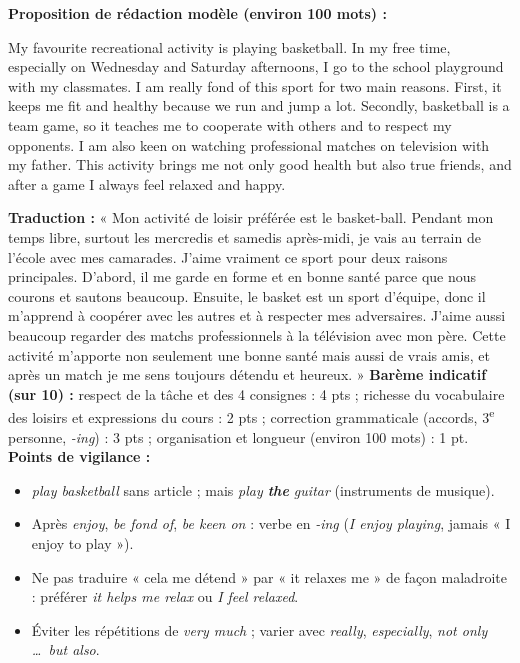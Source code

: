 \documentclass[11pt]{article}
\begin{document}
\begin{corrige}
\textbf{Proposition de rédaction modèle (environ 100 mots) :}
\begin{textebox}
My favourite recreational activity is playing basketball. In my free time, especially on Wednesday and Saturday afternoons, I go to the school playground with my classmates. I am really fond of this sport for two main reasons. First, it keeps me fit and healthy because we run and jump a lot. Secondly, basketball is a team game, so it teaches me to cooperate with others and to respect my opponents. I am also keen on watching professional matches on television with my father. This activity brings me not only good health but also true friends, and after a game I always feel relaxed and happy.
\end{textebox}
\textbf{Traduction :} « Mon activité de loisir préférée est le basket-ball. Pendant mon temps libre, surtout les mercredis et samedis après-midi, je vais au terrain de l'école avec mes camarades. J'aime vraiment ce sport pour deux raisons principales. D'abord, il me garde en forme et en bonne santé parce que nous courons et sautons beaucoup. Ensuite, le basket est un sport d'équipe, donc il m'apprend à coopérer avec les autres et à respecter mes adversaires. J'aime aussi beaucoup regarder des matchs professionnels à la télévision avec mon père. Cette activité m'apporte non seulement une bonne santé mais aussi de vrais amis, et après un match je me sens toujours détendu et heureux. »
\textbf{Barème indicatif (sur 10) :} respect de la tâche et des 4 consignes : 4 pts ; richesse du vocabulaire des loisirs et expressions du cours : 2 pts ; correction grammaticale (accords, 3\textsuperscript{e} personne, \emph{-ing}) : 3 pts ; organisation et longueur (environ 100 mots) : 1 pt.
\textbf{Points de vigilance :}
\begin{itemize}
\item \emph{play basketball} sans article ; mais \emph{play \textbf{the} guitar} (instruments de musique).
\item Après \emph{enjoy}, \emph{be fond of}, \emph{be keen on} : verbe en \emph{-ing} (\emph{I enjoy playing}, jamais « I enjoy to play »).
\item Ne pas traduire « cela me détend » par « it relaxes me » de façon maladroite : préférer \emph{it helps me relax} ou \emph{I feel relaxed}.
\item Éviter les répétitions de \emph{very much} ; varier avec \emph{really}, \emph{especially}, \emph{not only \ldots\ but also}.
\end{itemize}
\end{corrige}
\end{document}
